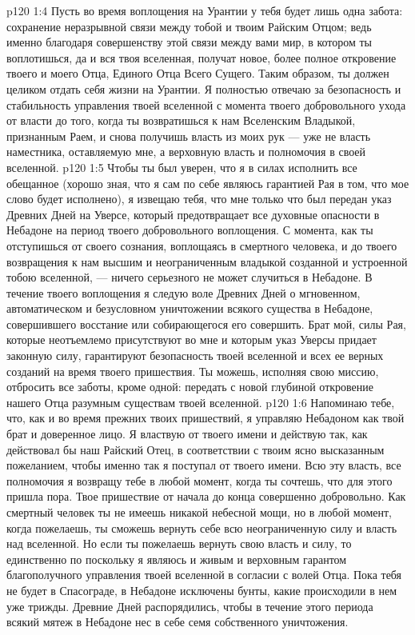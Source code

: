 \vs p120 1:4 Пусть во время воплощения на Урантии у тебя будет лишь одна забота: сохранение неразрывной связи между тобой и твоим Райским Отцом; ведь именно благодаря совершенству этой связи между вами мир, в котором ты воплотишься, да и вся твоя вселенная, получат новое, более полное откровение твоего и моего Отца, Единого Отца Всего Сущего. Таким образом, ты должен целиком отдать себя жизни на Урантии. Я полностью отвечаю за безопасность и стабильность управления твоей вселенной с момента твоего добровольного ухода от власти до того, когда ты возвратишься к нам Вселенским Владыкой, признанным Раем, и снова получишь власть из моих рук --- уже не власть наместника, оставляемую мне, а верховную власть и полномочия в своей вселенной.
\vs p120 1:5 Чтобы ты был уверен, что я в силах исполнить все обещанное (хорошо зная, что я сам по себе являюсь гарантией Рая в том, что мое слово будет исполнено), я извещаю тебя, что мне только что был передан указ Древних Дней на Уверсе, который предотвращает все духовные опасности в Небадоне на период твоего добровольного воплощения. С момента, как ты отступишься от своего сознания, воплощаясь в смертного человека, и до твоего возвращения к нам высшим и неограниченным владыкой созданной и устроенной тобою вселенной, --- ничего серьезного не может случиться в Небадоне. В течение твоего воплощения я следую воле Древних Дней о мгновенном, автоматическом и безусловном уничтожении всякого существа в Небадоне, совершившего восстание или собирающегося его совершить. Брат мой, силы Рая, которые неотъемлемо присутствуют во мне и которым указ Уверсы придает законную силу, гарантируют безопасность твоей вселенной и всех ее верных созданий на время твоего пришествия. Ты можешь, исполняя свою миссию, отбросить все заботы, кроме одной: передать с новой глубиной откровение нашего Отца разумным существам твоей вселенной.
\vs p120 1:6 Напоминаю тебе, что, как и во время прежних твоих пришествий, я управляю Небадоном как твой брат и доверенное лицо. Я властвую от твоего имени и действую так, как действовал бы наш Райский Отец, в соответствии с твоим ясно высказанным пожеланием, чтобы именно так я поступал от твоего имени. Всю эту власть, все полномочия я возвращу тебе в любой момент, когда ты сочтешь, что для этого пришла пора. Твое пришествие от начала до конца совершенно добровольно. Как смертный человек ты не имеешь никакой небесной мощи, но в любой момент, когда пожелаешь, ты сможешь вернуть себе всю неограниченную силу и власть над вселенной. Но если ты пожелаешь вернуть свою власть и силу, то единственно по  поскольку я являюсь и живым и верховным гарантом благополучного управления твоей вселенной в согласии с волей Отца. Пока тебя не будет в Спасограде, в Небадоне исключены бунты, какие происходили в нем уже трижды. Древние Дней распорядились, чтобы в течение этого периода всякий мятеж в Небадоне нес в себе семя собственного уничтожения.
